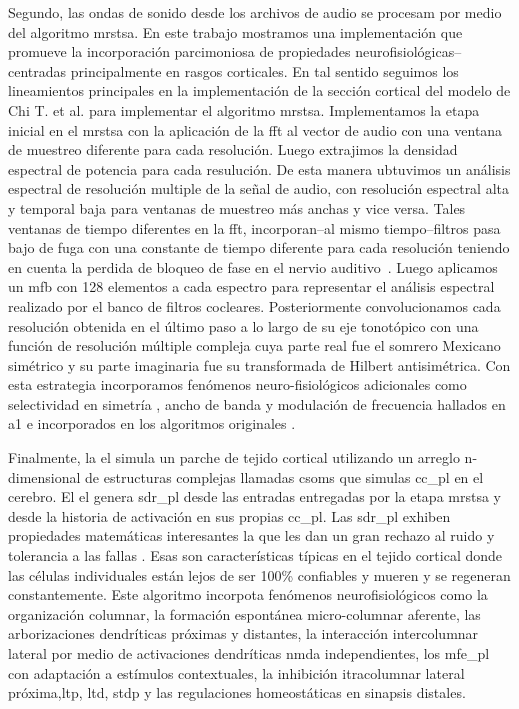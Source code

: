 {Segundo, las ondas de sonido desde los archivos de audio se procesam por medio del algoritmo \gls{mrstsa}.
En este trabajo mostramos una implementación que promueve la incorporación parcimoniosa de propiedades neurofisiológicas--centradas principalmente en rasgos corticales.
En tal sentido seguimos los lineamientos principales en la implementación de la sección cortical del modelo de Chi T. et al. \cite{chi_2005} para implementar el algoritmo \gls{mrstsa}.
Implementamos la etapa inicial en el \gls{mrstsa} con la aplicación de la \gls{fft} al vector de audio con una ventana de muestreo diferente para cada resolución.
Luego extrajimos la densidad espectral de potencia para cada resulución.
De esta manera ubtuvimos un análisis espectral de resolución multiple de la señal de audio, con resolución espectral alta y temporal baja para ventanas de muestreo más anchas y vice versa.
Tales ventanas de tiempo diferentes en la \gls{fft}, incorporan--al mismo tiempo--filtros pasa bajo de fuga con una constante de tiempo diferente para cada resolución teniendo en cuenta la perdida de bloqueo de fase en el nervio auditivo~\cite{chi_2005}.
Luego aplicamos un \gls{mfb} con 128 elementos a cada espectro para representar el análisis espectral realizado por el banco de filtros cocleares.
Posteriormente convolucionamos cada resolución obtenida en el último paso a lo largo de su eje tonotópico con una función de resolución múltiple compleja cuya parte real fue el somrero Mexicano simétrico y su parte imaginaria fue su transformada de Hilbert antisimétrica.
Con esta estrategia incorporamos fenómenos neuro-fisiológicos adicionales como selectividad en simetría \cite{shamma_1993}, ancho de banda \cite{schreiner_1990} y modulación de frecuencia \cite{shamma_1993,heil_1992,mendelson_1985} hallados en \gls{a1} e incorporados en los algoritmos originales \cite{wang_1995}.

Finalmente, la \gls{el} simula un parche de tejido cortical utilizando un arreglo n-dimensional de estructuras complejas llamadas \glspl{csom} que simulas \gls{cc_pl} en el cerebro.
El \gls{el} genera \gls{sdr_pl} \cite{ahmad_2016} desde las entradas entregadas por la etapa \gls{mrstsa} y desde la historia de activación en sus propias \gls{cc_pl}.
Las \gls{sdr_pl} exhiben propiedades matemáticas interesantes la que les dan un gran rechazo al ruido y tolerancia a las fallas \cite{DBLP:journals/corr/AhmadH15}.
Esas son características típicas en el tejido cortical donde las células individuales están lejos de ser 100\% confiables y mueren y se regeneran constantemente.
Este algoritmo incorpota fenómenos neurofisiológicos como la organización columnar, la formación espontánea micro-columnar aferente, las arborizaciones dendríticas próximas y distantes, la interacción intercolumnar lateral por medio de activaciones dendríticas \gls{nmda} independientes, los \gls{mfe_pl} con adaptación a estímulos contextuales, la inhibición itracolumnar lateral próxima,\gls{ltp}, \gls{ltd}, \gls{stdp} y las regulaciones homeostáticas en sinapsis distales.

}
